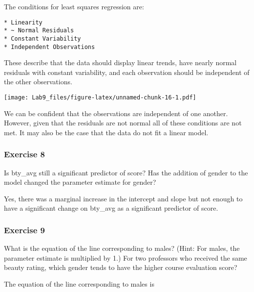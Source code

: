 \documentclass[
]{article}
\newenvironment{Shaded}{\begin{snugshade}}{\end{snugshade}}
\newcommand{\KeywordTok}[1]{\textcolor[rgb]{0.13,0.29,0.53}{\textbf{#1}}}
\newcommand{\NormalTok}[1]{#1}
\newcommand{\OperatorTok}[1]{\textcolor[rgb]{0.81,0.36,0.00}{\textbf{#1}}}
\begin{document}
The conditions for least squares regression are:

\begin{verbatim}
* Linearity
* ~ Normal Residuals
* Constant Variability
* Independent Observations
\end{verbatim}

These describe that the data should display linear trends, have nearly
normal residuals with constant variability, and each observation should
be independent of the other observations.

\begin{Shaded}
\end{Shaded}

\texttt{[image: Lab9\_files/figure-latex/unnamed-chunk-16-1.pdf]}

We can be confident that the observations are independent of one
another. However, given that the residuals are not normal all of these
conditions are not met. It may also be the case that the data do not fit
a linear model.

\hypertarget{exercise-8}{%
\subsubsection{Exercise 8}\label{exercise-8}}

Is bty\_avg still a significant predictor of score? Has the addition of
gender to the model changed the parameter estimate for gender?

Yes, there was a marginal increase in the intercept and slope but not
enough to have a significant change on bty\_avg as a significant
predictor of score.

\hypertarget{exercise-9}{%
\subsubsection{Exercise 9}\label{exercise-9}}

What is the equation of the line corresponding to males? (Hint: For
males, the parameter estimate is multiplied by 1.) For two professors
who received the same beauty rating, which gender tends to have the
higher course evaluation score?

The equation of the line corresponding to males is
\end{document}
